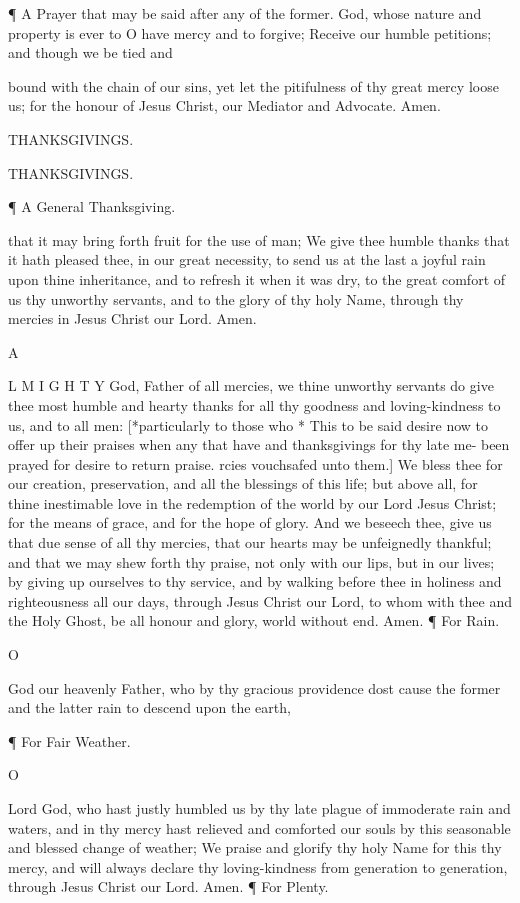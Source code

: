 ¶ A Prayer that may be said after any of the former. God, whose nature and property is ever to O have mercy and to forgive; Receive our humble petitions; and though we be tied and

bound with the chain of our sins, yet let the pitifulness of thy great mercy loose us; for the honour of Jesus Christ, our Mediator and Advocate. Amen.

THANKSGIVINGS.

THANKSGIVINGS.

¶ A General Thanksgiving.

that it may bring forth fruit for the use of man; We give thee humble thanks that it hath pleased thee, in our great necessity, to send us at the last a joyful rain upon thine inheritance, and to refresh it when it was dry, to the great comfort of us thy unworthy servants, and to the glory of thy holy Name, through thy mercies in Jesus Christ our Lord. Amen.

A

L M I G H T Y God, Father of all mercies, we thine unworthy servants do give thee most humble and hearty thanks for all thy goodness and loving-kindness to us, and to all men: [*particularly to those who * This to be said desire now to offer up their praises when any that have and thanksgivings for thy late me- been prayed for desire to return praise. rcies vouchsafed unto them.] We bless thee for our creation, preservation, and all the blessings of this life; but above all, for thine inestimable love in the redemption of the world by our Lord Jesus Christ; for the means of grace, and for the hope of glory. And we beseech thee, give us that due sense of all thy mercies, that our hearts may be unfeignedly thankful; and that we may shew forth thy praise, not only with our lips, but in our lives; by giving up ourselves to thy service, and by walking before thee in holiness and righteousness all our days, through Jesus Christ our Lord, to whom with thee and the Holy Ghost, be all honour and glory, world without end. Amen. ¶ For Rain.

O

God our heavenly Father, who by thy gracious providence dost cause the former and the latter rain to descend upon the earth,

¶ For Fair Weather.

O

Lord God, who hast justly humbled us by thy late plague of immoderate rain and waters, and in thy mercy hast relieved and comforted our souls by this seasonable and blessed change of weather; We praise and glorify thy holy Name for this thy mercy, and will always declare thy loving-kindness from generation to generation, through Jesus Christ our Lord. Amen. ¶ For Plenty.

